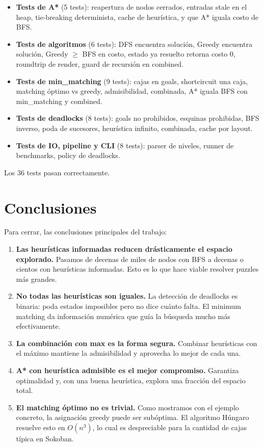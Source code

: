 \documentclass[12pt, a4paper]{article}
\begin{document}
\begin{itemize}
  \item \textbf{Tests de A*} (5 tests): reapertura de nodos cerrados, entradas stale en el heap, tie-breaking determinista, cache de heurística, y que A* iguala costo de BFS.
  \item \textbf{Tests de algoritmos} (6 tests): DFS encuentra solución, Greedy encuentra solución, Greedy $\geq$ BFS en costo, estado ya resuelto retorna costo 0, roundtrip de render, guard de recursión en combined.
  \item \textbf{Tests de min\_matching} (9 tests): cajas en goals, shortcircuit una caja, matching óptimo vs greedy, admisibilidad, combinada, A* iguala BFS con min\_matching y combined.
  \item \textbf{Tests de deadlocks} (8 tests): goals no prohibidos, esquinas prohibidas, BFS inverso, poda de sucesores, heurística infinito, combinada, cache por layout.
  \item \textbf{Tests de IO, pipeline y CLI} (8 tests): parser de niveles, runner de benchmarks, policy de deadlocks.
\end{itemize}

Los 36 tests pasan correctamente.

\section{Conclusiones}

Para cerrar, las conclusiones principales del trabajo:

\begin{enumerate}
  \item \textbf{Las heurísticas informadas reducen drásticamente el espacio explorado.} Pasamos de decenas de miles de nodos con BFS a decenas o cientos con heurísticas informadas. Esto es lo que hace viable resolver puzzles más grandes.

  \item \textbf{No todas las heurísticas son iguales.} La detección de deadlocks es binaria: poda estados imposibles pero no dice cuánto falta. El minimum matching da información numérica que guía la búsqueda mucho más efectivamente.

  \item \textbf{La combinación con max es la forma segura.} Combinar heurísticas con el máximo mantiene la admisibilidad y aprovecha lo mejor de cada una.

  \item \textbf{A* con heurística admisible es el mejor compromiso.} Garantiza optimalidad y, con una buena heurística, explora una fracción del espacio total.

  \item \textbf{El matching óptimo no es trivial.} Como mostramos con el ejemplo concreto, la asignación greedy puede ser subóptima. El algoritmo Húngaro resuelve esto en $O(n^3)$, lo cual es despreciable para la cantidad de cajas típica en Sokoban.
\end{enumerate}
\end{document}
